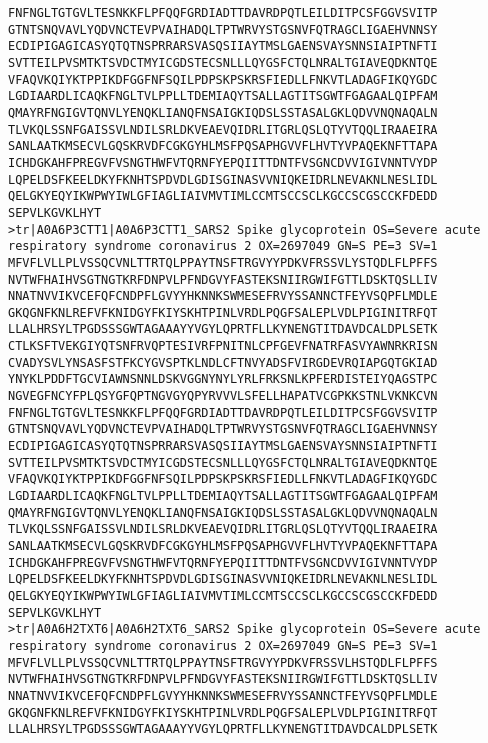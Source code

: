 \begin{lstlisting}
FNFNGLTGTGVLTESNKKFLPFQQFGRDIADTTDAVRDPQTLEILDITPCSFGGVSVITP
GTNTSNQVAVLYQDVNCTEVPVAIHADQLTPTWRVYSTGSNVFQTRAGCLIGAEHVNNSY
ECDIPIGAGICASYQTQTNSPRRARSVASQSIIAYTMSLGAENSVAYSNNSIAIPTNFTI
SVTTEILPVSMTKTSVDCTMYICGDSTECSNLLLQYGSFCTQLNRALTGIAVEQDKNTQE
VFAQVKQIYKTPPIKDFGGFNFSQILPDPSKPSKRSFIEDLLFNKVTLADAGFIKQYGDC
LGDIAARDLICAQKFNGLTVLPPLLTDEMIAQYTSALLAGTITSGWTFGAGAALQIPFAM
QMAYRFNGIGVTQNVLYENQKLIANQFNSAIGKIQDSLSSTASALGKLQDVVNQNAQALN
TLVKQLSSNFGAISSVLNDILSRLDKVEAEVQIDRLITGRLQSLQTYVTQQLIRAAEIRA
SANLAATKMSECVLGQSKRVDFCGKGYHLMSFPQSAPHGVVFLHVTYVPAQEKNFTTAPA
ICHDGKAHFPREGVFVSNGTHWFVTQRNFYEPQIITTDNTFVSGNCDVVIGIVNNTVYDP
LQPELDSFKEELDKYFKNHTSPDVDLGDISGINASVVNIQKEIDRLNEVAKNLNESLIDL
QELGKYEQYIKWPWYIWLGFIAGLIAIVMVTIMLCCMTSCCSCLKGCCSCGSCCKFDEDD
SEPVLKGVKLHYT
>tr|A0A6P3CTT1|A0A6P3CTT1_SARS2 Spike glycoprotein OS=Severe acute respiratory syndrome coronavirus 2 OX=2697049 GN=S PE=3 SV=1
MFVFLVLLPLVSSQCVNLTTRTQLPPAYTNSFTRGVYYPDKVFRSSVLYSTQDLFLPFFS
NVTWFHAIHVSGTNGTKRFDNPVLPFNDGVYFASTEKSNIIRGWIFGTTLDSKTQSLLIV
NNATNVVIKVCEFQFCNDPFLGVYYHKNNKSWMESEFRVYSSANNCTFEYVSQPFLMDLE
GKQGNFKNLREFVFKNIDGYFKIYSKHTPINLVRDLPQGFSALEPLVDLPIGINITRFQT
LLALHRSYLTPGDSSSGWTAGAAAYYVGYLQPRTFLLKYNENGTITDAVDCALDPLSETK
CTLKSFTVEKGIYQTSNFRVQPTESIVRFPNITNLCPFGEVFNATRFASVYAWNRKRISN
CVADYSVLYNSASFSTFKCYGVSPTKLNDLCFTNVYADSFVIRGDEVRQIAPGQTGKIAD
YNYKLPDDFTGCVIAWNSNNLDSKVGGNYNYLYRLFRKSNLKPFERDISTEIYQAGSTPC
NGVEGFNCYFPLQSYGFQPTNGVGYQPYRVVVLSFELLHAPATVCGPKKSTNLVKNKCVN
FNFNGLTGTGVLTESNKKFLPFQQFGRDIADTTDAVRDPQTLEILDITPCSFGGVSVITP
GTNTSNQVAVLYQDVNCTEVPVAIHADQLTPTWRVYSTGSNVFQTRAGCLIGAEHVNNSY
ECDIPIGAGICASYQTQTNSPRRARSVASQSIIAYTMSLGAENSVAYSNNSIAIPTNFTI
SVTTEILPVSMTKTSVDCTMYICGDSTECSNLLLQYGSFCTQLNRALTGIAVEQDKNTQE
VFAQVKQIYKTPPIKDFGGFNFSQILPDPSKPSKRSFIEDLLFNKVTLADAGFIKQYGDC
LGDIAARDLICAQKFNGLTVLPPLLTDEMIAQYTSALLAGTITSGWTFGAGAALQIPFAM
QMAYRFNGIGVTQNVLYENQKLIANQFNSAIGKIQDSLSSTASALGKLQDVVNQNAQALN
TLVKQLSSNFGAISSVLNDILSRLDKVEAEVQIDRLITGRLQSLQTYVTQQLIRAAEIRA
SANLAATKMSECVLGQSKRVDFCGKGYHLMSFPQSAPHGVVFLHVTYVPAQEKNFTTAPA
ICHDGKAHFPREGVFVSNGTHWFVTQRNFYEPQIITTDNTFVSGNCDVVIGIVNNTVYDP
LQPELDSFKEELDKYFKNHTSPDVDLGDISGINASVVNIQKEIDRLNEVAKNLNESLIDL
QELGKYEQYIKWPWYIWLGFIAGLIAIVMVTIMLCCMTSCCSCLKGCCSCGSCCKFDEDD
SEPVLKGVKLHYT
>tr|A0A6H2TXT6|A0A6H2TXT6_SARS2 Spike glycoprotein OS=Severe acute respiratory syndrome coronavirus 2 OX=2697049 GN=S PE=3 SV=1
MFVFLVLLPLVSSQCVNLTTRTQLPPAYTNSFTRGVYYPDKVFRSSVLHSTQDLFLPFFS
NVTWFHAIHVSGTNGTKRFDNPVLPFNDGVYFASTEKSNIIRGWIFGTTLDSKTQSLLIV
NNATNVVIKVCEFQFCNDPFLGVYYHKNNKSWMESEFRVYSSANNCTFEYVSQPFLMDLE
GKQGNFKNLREFVFKNIDGYFKIYSKHTPINLVRDLPQGFSALEPLVDLPIGINITRFQT
LLALHRSYLTPGDSSSGWTAGAAAYYVGYLQPRTFLLKYNENGTITDAVDCALDPLSETK

\end{lstlisting}
